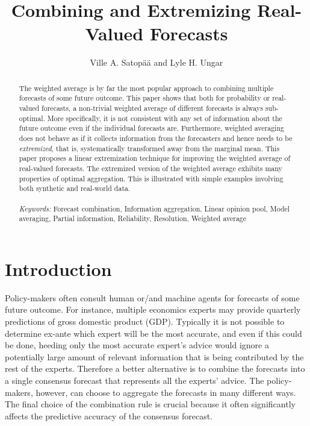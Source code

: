 \documentclass[11pt]{article}
\title{Combining and Extremizing Real-Valued Forecasts}
\author{
Ville A. Satop\"a\"a and Lyle H. Ungar}
\date{}
\theoremstyle{definition}
\theoremstyle{definition}
\begin{document}
\maketitle

\begin{abstract}

The weighted average is by far the most popular approach to combining
multiple forecasts of some future outcome. This paper shows that
both for probability or real-valued forecasts, a non-trivial weighted average
of different forecasts is always sub-optimal. More specifically, it is
not consistent with any set of information about the future outcome
even if the individual forecasts are. Furthermore, weighted averaging
does not behave as if it collects information from the forecasters and
hence needs to be \textit{extremized}, that is, 
systematically transformed away from the marginal mean. This paper
proposes a linear extremization technique for improving the weighted
average of real-valued forecasts. The extremized
version of the weighted average exhibits many properties of optimal
aggregation. This is illustrated with simple examples involving both
synthetic and real-world data. \\
\\
\textit{Keywords:} Forecast combination, Information aggregation, Linear opinion pool, Model averaging, Partial information, Reliability, Resolution, Weighted average
\end{abstract}


\section{Introduction} \label{introduction}

Policy-makers often consult human or/and machine agents for forecasts
of some future outcome. For instance, multiple economics experts may
provide quarterly predictions of gross domestic product (GDP). Typically it is not possible to determine ex-ante which expert will be the most accurate, and even if this could be done, heeding only the most accurate expert's advice would ignore a potentially large amount of relevant information that is being contributed by the rest of the experts. Therefore a better alternative is to combine the
forecasts into a single consensus forecast that represents all the experts' advice. 
The policy-makers, however, can choose to aggregate the forecasts in many different ways. The final choice of the combination rule is crucial because it often
significantly affects the predictive accuracy of the consensus
forecast. 
\end{document}
